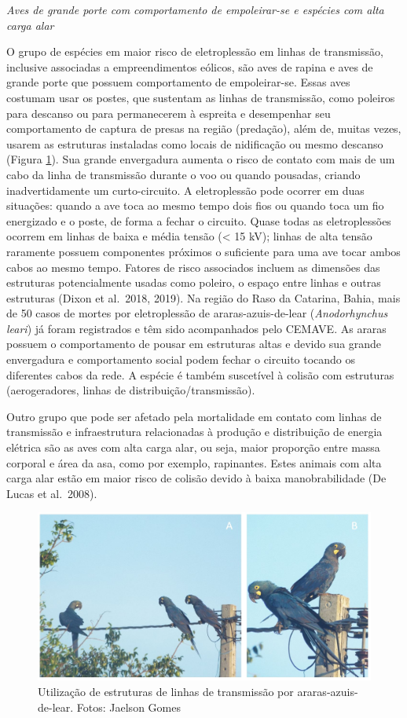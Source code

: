 \documentclass[
  oneside]{scrbook}
\begin{document}
\emph{Aves de grande porte com comportamento de empoleirar-se e espécies com alta carga alar}

O grupo de espécies em maior risco de eletroplessão em linhas de transmissão, inclusive associadas a empreendimentos eólicos, são aves de rapina e aves de grande porte que possuem comportamento de empoleirar-se. Essas aves costumam usar os postes, que sustentam as linhas de transmissão, como poleiros para descanso ou para permanecerem à espreita e desempenhar seu comportamento de captura de presas na região (predação), além de, muitas vezes, usarem as estruturas instaladas como locais de nidificação ou mesmo descanso (Figura \ref{fig:15}). Sua grande envergadura aumenta o risco de contato com mais de um cabo da linha de transmissão durante o voo ou quando pousadas, criando inadvertidamente um curto-circuito. A eletroplessão pode ocorrer em duas situações: quando a ave toca ao mesmo tempo dois fios ou quando toca um fio energizado e o poste, de forma a fechar o circuito. Quase todas as eletroplessões ocorrem em linhas de baixa e média tensão (\textless{} 15 kV); linhas de alta tensão raramente possuem componentes próximos o suficiente para uma ave tocar ambos cabos ao mesmo tempo. Fatores de risco associados incluem as dimensões das estruturas potencialmente usadas como poleiro, o espaço entre linhas e outras estruturas (Dixon et al.~2018, 2019). Na região do Raso da Catarina, Bahia, mais de 50 casos de mortes por eletroplessão de araras-azuis-de-lear (\emph{Anodorhynchus leari}) já foram registrados e têm sido acompanhados pelo CEMAVE. As araras possuem o comportamento de pousar em estruturas altas e devido sua grande envergadura e comportamento social podem fechar o circuito tocando os diferentes cabos da rede. A espécie é também suscetível à colisão com estruturas (aerogeradores, linhas de distribuição/transmissão).

Outro grupo que pode ser afetado pela mortalidade em contato com linhas de transmissão e infraestrutura relacionadas à produção e distribuição de energia elétrica são as aves com alta carga alar, ou seja, maior proporção entre massa corporal e área da asa, como por exemplo, rapinantes. Estes animais com alta carga alar estão em maior risco de colisão devido à baixa manobrabilidade (De Lucas et al.~2008).

\begin{figure}[H]

{\centering \includegraphics[width=0.75\linewidth]{imagens/cap04/Figura_4.4ab} 

}

\caption{Utilização de estruturas de linhas de transmissão por araras-azuis-de-lear. Fotos: Jaelson Gomes}\label{fig:15}
\end{figure}
\end{document}
